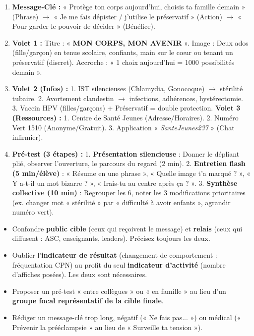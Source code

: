 \documentclass[11pt]{article}
\begin{document}
\begin{corrige}
\begin{enumerate}
    \item \textbf{Message-Clé :} « Protège ton corps aujourd'hui, choisis ta famille demain » (Phrase) $\rightarrow$ « Je me fais dépister / j'utilise le préservatif » (Action) $\rightarrow$ « Pour garder le pouvoir de décider » (Bénéfice).
    \item \textbf{Volet 1 :} Titre : « \textbf{MON CORPS, MON AVENIR} ». Image : Deux ados (fille/garçon) en tenue scolaire, confiants, main sur le cœur ou tenant un préservatif (discret). Accroche : « 1 choix aujourd'hui = 1000 possibilités demain ».
    \item \textbf{Volet 2 (Infos) :} 1. IST silencieuses (Chlamydia, Gonocoque) $\rightarrow$ stérilité tubaire. 2. Avortement clandestin $\rightarrow$ infections, adhérences, hystérectomie. 3. Vaccin HPV (filles/garçons) + Préservatif = double protection. \textbf{Volet 3 (Ressources) :} 1. Centre de Santé Jeunes (Adresse/Horaires). 2. Numéro Vert 1510 (Anonyme/Gratuit). 3. Application « \emph{SanteJeunes237} » (Chat infirmier).
    \item \textbf{Pré-test (3 étapes) :} 1. \textbf{Présentation silencieuse} : Donner le dépliant plié, observer l'ouverture, le parcours du regard (2 min). 2. \textbf{Entretien flash (5 min/élève)} : « Résume en une phrase », « Quelle image t'a marqué ? », « Y a-t-il un mot bizarre ? », « Irais-tu au centre après ça ? ». 3. \textbf{Synthèse collective (10 min)} : Regrouper les 6, noter les 3 modifications prioritaires (ex. changer mot « stérilité » par « difficulté à avoir enfants », agrandir numéro vert).
\end{enumerate}
\end{corrige}

\begin{attention}
\begin{itemize}
    \item Confondre \textbf{public cible} (ceux qui reçoivent le message) et \textbf{relais} (ceux qui diffusent : ASC, enseignants, leaders). Précisez toujours les deux.
    \item Oublier l'\textbf{indicateur de résultat} (changement de comportement : fréquentation CPN) au profit du seul \textbf{indicateur d'activité} (nombre d'affiches posées). Les deux sont nécessaires.
    \item Proposer un pré-test « entre collègues » ou « en famille » au lieu d'un \textbf{groupe focal représentatif de la cible finale}.
    \item Rédiger un message-clé trop long, négatif (« Ne fais pas... ») ou médical (« Prévenir la prééclampsie » au lieu de « Surveille ta tension »).
\end{itemize}
\end{attention}
\end{document}
